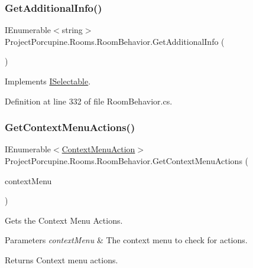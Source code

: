 \subsubsection{\texorpdfstring{Get\+Additional\+Info()}{GetAdditionalInfo()}}
{\footnotesize\ttfamily I\+Enumerable$<$string$>$ Project\+Porcupine.\+Rooms.\+Room\+Behavior.\+Get\+Additional\+Info (\begin{DoxyParamCaption}{ }\end{DoxyParamCaption})}



Implements \hyperlink{interface_i_selectable_a337f81bfa99bb254bb2f7de6a8b5cd4b}{I\+Selectable}.



Definition at line 332 of file Room\+Behavior.\+cs.

\mbox{\label{class_project_porcupine_1_1_rooms_1_1_room_behavior_a21b7f3134d1a74f70aa7a1d0f8ee9c23}} 
\subsubsection{\texorpdfstring{Get\+Context\+Menu\+Actions()}{GetContextMenuActions()}}
{\footnotesize\ttfamily I\+Enumerable$<$\hyperlink{class_context_menu_action}{Context\+Menu\+Action}$>$ Project\+Porcupine.\+Rooms.\+Room\+Behavior.\+Get\+Context\+Menu\+Actions (\begin{DoxyParamCaption}\item[{\hyperlink{class_context_menu}{Context\+Menu}}]{context\+Menu }\end{DoxyParamCaption})}



Gets the Context Menu Actions. 


\begin{DoxyParams}{Parameters}
{\em context\+Menu} & The context menu to check for actions.\\
\hline
\end{DoxyParams}
\begin{DoxyReturn}{Returns}
Context menu actions.
\end{DoxyReturn}


